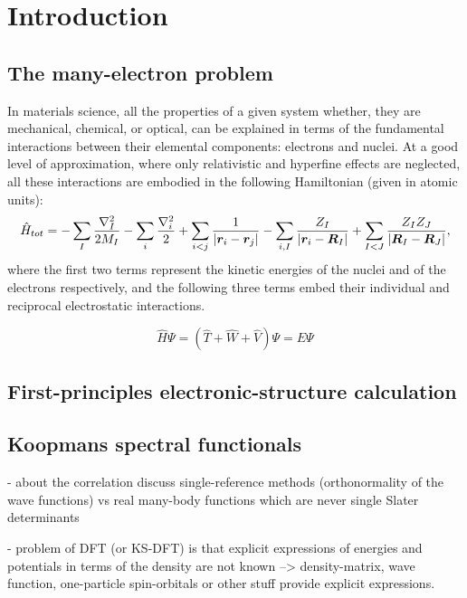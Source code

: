 \cleardoublepage
\chapter{Introduction\label{ch:introduction}}

\section{The many-electron problem}
In materials science, all the properties of a given system whether, they are mechanical, chemical, or optical, can be explained in terms of the fundamental interactions between their elemental components: electrons and nuclei. At a good level of approximation, where only relativistic and hyperfine effects are neglected, all these interactions are embodied in the following Hamiltonian (given in atomic units):
%
\begin{equation}
    \hat{H}_{tot} = - \sum_I \frac{\nabla_I^2}{2M_I} - \sum_i \frac{\nabla_i^2}{2} + \sum_{i < j} \frac{1}{|{\bm r}_i - {\bm r}_j|} - \sum_{i,I} \frac{Z_I}{|{\bm r}_i - {\bm R}_I|} + \sum_{I < J} \frac{Z_I Z_J}{|{\bm R}_I - {\bm R}_J|} ,
    \label{eq:many-body}
\end{equation}
%
where the first two terms represent the kinetic energies of the nuclei and of the electrons respectively, and the following three terms embed their individual and reciprocal electrostatic interactions.

\begin{equation}
    \hat{H} \Psi = \left(\hat{T} + \hat{W} + \hat{V} \right) \Psi = E \Psi
    \label{eq:many-electron-problem}
\end{equation}

\section{First-principles electronic-structure calculation\label{sec:first-principles-methods}}

\section{Koopmans spectral functionals\label{sec:intro-koopmans}}
- about the correlation discuss single-reference methods (orthonormality of the wave functions) vs real many-body functions which are never single Slater determinants

- problem of DFT (or KS-DFT) is that explicit expressions of energies and potentials in terms of the density are not known --> density-matrix, wave function, one-particle spin-orbitals or other stuff provide explicit expressions.


